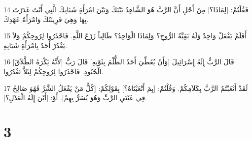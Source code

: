 \par 14 فَقُلْتُمْ: [لِمَاذَا؟] مِنْ أَجْلِ أَنَّ الرَّبَّ هُوَ الشَّاهِدُ بَيْنَكَ وَبَيْنَ امْرَأَةِ شَبَابِكَ الَّتِي أَنْتَ غَدَرْتَ بِهَا وَهِيَ قَرِينَتُكَ وَامْرَأَةُ عَهْدِكَ.
\par 15 أَفَلَمْ يَفْعَلْ وَاحِدٌ وَلَهُ بَقِيَّةُ الرُّوحِ؟ وَلِمَاذَا الْوَاحِدُ؟ طَالِباً زَرْعَ اللَّهِ. فَاحْذَرُوا لِرُوحِكُمْ وَلاَ يَغْدُرْ أَحَدٌ بِامْرَأَةِ شَبَابِهِ.
\par 16 [لأَنَّهُ يَكْرَهُ الطَّلاَقَ] قَالَ الرَّبُّ إِلَهُ إِسْرَائِيلَ [وَأَنْ يُغَطِّيَ أَحَدٌ الظُّلْمَ بِثَوْبِهِ] قَالَ رَبُّ الْجُنُودِ. فَاحْذَرُوا لِرُوحِكُمْ لِئَلاَّ تَغْدُرُوا.
\par 17 لَقَدْ أَتْعَبْتُمُ الرَّبَّ بِكَلاَمِكُمْ. وَقُلْتُمْ: [بِمَ أَتْعَبْنَاهُ؟] بِقَوْلِكُمْ: [كُلُّ مَنْ يَفْعَلُ الشَّرَّ فَهُوَ صَالِحٌ فِي عَيْنَيِ الرَّبِّ وَهُوَ يُسَرُّ بِهِمْ]. أَوْ: [أَيْنَ إِلَهُ الْعَدْلِ؟].

\chapter{3}

